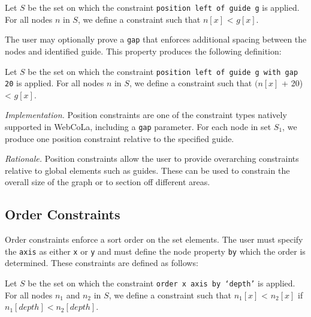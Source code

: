\begin{definition}
Let $S$ be the set on which the constraint \texttt{position left of guide g} is applied.
For all nodes $n$ in $S$, we define a constraint such that $n[x]$ < $g[x]$.
\end{definition}

The user may optionally prove a \texttt{gap} that enforces additional spacing
between the nodes and identified guide. This property produces the following
definition:

\begin{definition}
Let $S$ be the set on which the constraint \texttt{position left of guide g with gap 20} is applied.
For all nodes $n$ in $S$, we define a constraint such that $(n[x]$ + 20) < $g[x]$.
\end{definition}

\emph{Implementation.}
Position constraints are one of the constraint types natively supported in
WebCoLa, including a \texttt{gap} parameter. For each node
in set $S_1$, we produce one position constraint relative to the specified guide.

\emph{Rationale.} Position constraints allow the user to provide
overarching constraints relative to global elements such as guides. These
can be used to constrain the overall size of the graph or to section off
different areas.



\subsection{Order Constraints}

Order constraints enforce a sort order on the set elements. The user must 
specify the \texttt{axis} as either \texttt{x} or \texttt{y} and must define
the node property \texttt{by} which the order is determined. These 
constraints are defined as follows:

\begin{definition}
Let $S$ be the set on which the constraint \texttt{order x axis by `depth'} is applied.
For all nodes $n_1$ and $n_2$ in $S$, we define a constraint such that $n_1[x]$ < $n_2[x]$
if $n_1[depth] < n_2[depth]$.
\end{definition}

